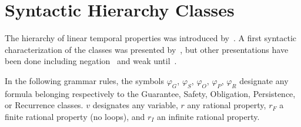 \documentclass[a4paper,twoside,10pt,DIV=12,draft]{scrreprt}
\newcommand{\0}{\texttt{0}}
\newcommand{\1}{\texttt{1}}
\begin{document}
\section{Syntactic Hierarchy Classes}

The hierarchy of linear temporal properties was introduced
by~\citet{manna.87.podc}.  A first syntactic characterization of the
classes was presented by~\citet{chang.92.icalp}, but other
presentations have been done including negation~\citep{cerna.03.mfcs}
and weak until~\citep{schneider.01.lpar}.

In the following grammar rules, the symbols $\varphi_G$, $\varphi_S$,
$\varphi_O$, $\varphi_P$, $\varphi_R$ designate any formula belonging
respectively to the Guarantee, Safety, Obligation, Persistence, or
Recurrence classes.  $v$ designates any variable, $r$ any rational
property, $r_F$ a finite rational property (no loops), and $r_I$ an
infinite rational property.
\end{document}
